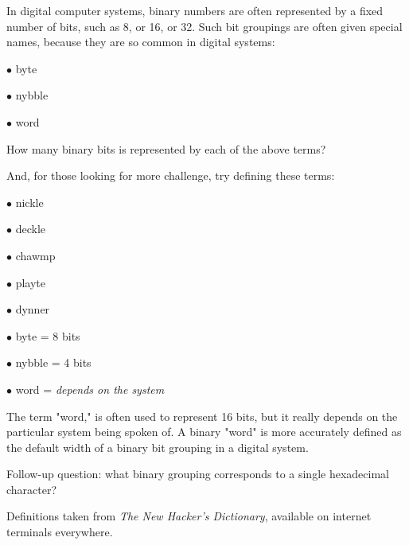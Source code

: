 

In digital computer systems, binary numbers are often represented by a fixed number of bits, such as 8, or 16, or 32.  Such bit groupings are often given special names, because they are so common in digital systems:

\medskip
\item{$\bullet$} byte
\item{$\bullet$} nybble
\item{$\bullet$} word
\medskip

How many binary bits is represented by each of the above terms?

\vskip 10pt

And, for those looking for more challenge, try defining these terms:

\medskip
\item{$\bullet$} nickle
\item{$\bullet$} deckle
\item{$\bullet$} chawmp
\item{$\bullet$} playte
\item{$\bullet$} dynner
\medskip







\medskip
\item{$\bullet$} byte = 8 bits
\item{$\bullet$} nybble = 4 bits
\item{$\bullet$} word = {\it depends on the system}
\medskip

The term "word," is often used to represent 16 bits, but it really depends on the particular system being spoken of.  A binary "word" is more accurately defined as the default width of a binary bit grouping in a digital system.

\vskip 10pt

Follow-up question: what binary grouping corresponds to a single hexadecimal character?







Definitions taken from {\it The New Hacker's Dictionary}, available on internet terminals everywhere.




